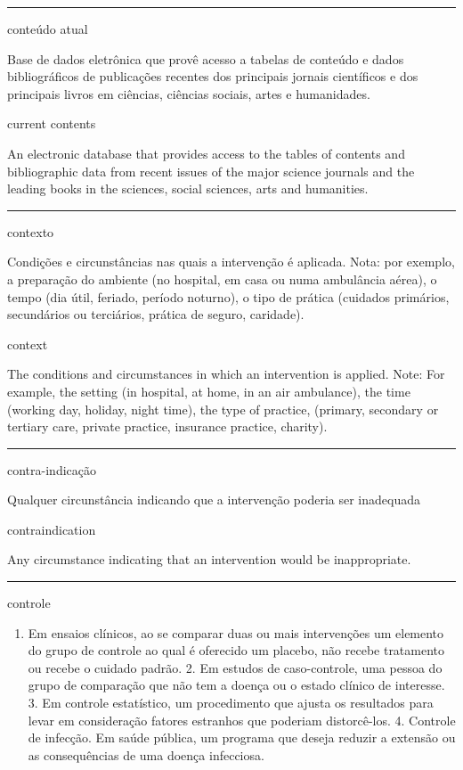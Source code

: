 \documentclass[
  openany]{book}
\providecommand{\tightlist}{%
  \setlength{\itemsep}{0pt}\setlength{\parskip}{0pt}}
\begin{document}
\begin{center}\rule{0.5\linewidth}{0.5pt}\end{center}

conteúdo atual

Base de dados eletrônica que provê acesso a tabelas de conteúdo e dados bibliográficos de publicações recentes dos principais jornais científicos e dos principais livros em ciências, ciências sociais, artes e humanidades.

current contents

An electronic database that provides access to the tables of contents and bibliographic data from recent issues of the major science journals and the leading books in the sciences, social sciences, arts and humanities.

\begin{center}\rule{0.5\linewidth}{0.5pt}\end{center}

contexto

Condições e circunstâncias nas quais a intervenção é aplicada. Nota: por exemplo, a preparação do ambiente (no hospital, em casa ou numa ambulância aérea), o tempo (dia útil, feriado, período noturno), o tipo de prática (cuidados primários, secundários ou terciários, prática de seguro, caridade).

context

The conditions and circumstances in which an intervention is applied. Note: For example, the setting (in hospital, at home, in an air ambulance), the time (working day, holiday, night time), the type of practice, (primary, secondary or tertiary care, private practice, insurance practice, charity).

\begin{center}\rule{0.5\linewidth}{0.5pt}\end{center}

contra-indicação

Qualquer circunstância indicando que a intervenção poderia ser inadequada

contraindication

Any circumstance indicating that an intervention would be inappropriate.

\begin{center}\rule{0.5\linewidth}{0.5pt}\end{center}

controle

\begin{enumerate}
\def\labelenumi{\arabic{enumi}.}
\tightlist
\item
  Em ensaios clínicos, ao se comparar duas ou mais intervenções um elemento do grupo de controle ao qual é oferecido um placebo, não recebe tratamento ou recebe o cuidado padrão. 2. Em estudos de caso-controle, uma pessoa do grupo de comparação que não tem a doença ou o estado clínico de interesse. 3. Em controle estatístico, um procedimento que ajusta os resultados para levar em consideração fatores estranhos que poderiam distorcê-los. 4. Controle de infecção. Em saúde pública, um programa que deseja reduzir a extensão ou as consequências de uma doença infecciosa.
\end{enumerate}
\end{document}

